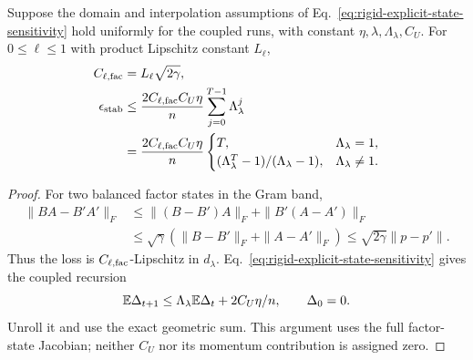 \begin{corollary}
\label{cor:rigid-explicit-state-stability}
Suppose the domain and interpolation assumptions of
Eq.~\eqref{eq:rigid-explicit-state-sensitivity} hold uniformly for the
coupled runs, with constant $\eta,\lambda,\Lambda_\lambda,C_U$.
For $0\leq\ell\leq1$ with product Lipschitz constant $L_\ell$,
\begin{align}
C_{\ell,{\rm fac}}&=L_\ell\sqrt{2\gamma},\\
\epsilon_{\rm stab}
&\leq\frac{2C_{\ell,{\rm fac}}C_U\eta}{n}
\sum_{j=0}^{T-1}\Lambda_\lambda^j\\
&=\frac{2C_{\ell,{\rm fac}}C_U\eta}{n}
\begin{cases}
T,&\Lambda_\lambda=1,\\
(\Lambda_\lambda^T-1)/(\Lambda_\lambda-1),
&\Lambda_\lambda\ne1 .
\end{cases}
\label{eq:rigid-explicit-state-stability}
\end{align}
\end{corollary}
\begin{proof}
For two balanced factor states in the Gram band,
\begin{align}
\|BA-B'A'\|_F
&\leq\|(B-B')A\|_F+\|B'(A-A')\|_F\\
&\leq\sqrt\gamma(\|B-B'\|_F+\|A-A'\|_F)
\leq\sqrt{2\gamma}\|p-p'\|.
\end{align}
Thus the loss is $C_{\ell,{\rm fac}}$-Lipschitz in $d_\lambda$.
Eq.~\eqref{eq:rigid-explicit-state-sensitivity} gives the coupled
recursion
\begin{equation}
\mathbb E\Delta_{t+1}\leq\Lambda_\lambda\mathbb E\Delta_t+2C_U\eta/n,
\qquad\Delta_0=0 .
\end{equation}
Unroll it and use the exact geometric sum. This argument uses the
full factor-state Jacobian; neither $C_U$ nor its momentum contribution
is assigned zero.
\end{proof}


